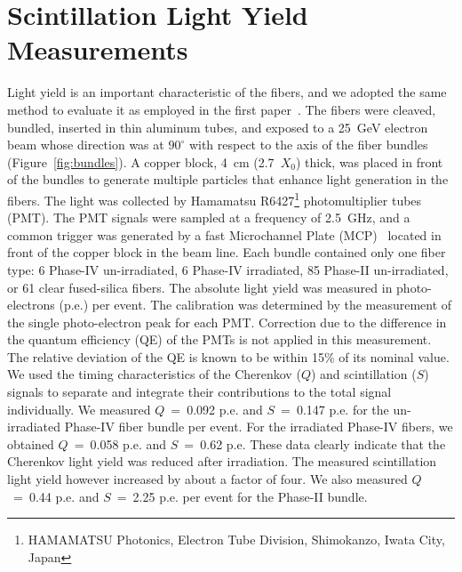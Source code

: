 \documentclass[a4paper,11pt]{article}
\begin{document}
\section{Scintillation Light Yield Measurements}
\label{sec:lightyield}
Light yield is an important characteristic of the fibers, and we adopted the same method to evaluate it as employed in the first paper~\cite{JINSTPaper}.   The fibers were cleaved, bundled, inserted in thin aluminum tubes, and exposed to a 25~GeV electron beam whose direction was at $90^{\circ}$ with respect to the axis of the fiber bundles (Figure~\ref{fig:bundles}). A copper block, 4~cm (2.7~$X_0$) thick, was placed in front of the bundles to generate multiple particles that enhance light generation in the fibers. The light was collected by Hamamatsu R6427\footnote{HAMAMATSU Photonics, Electron Tube Division, Shimokanzo, Iwata City, Japan} photomultiplier tubes (PMT). The PMT signals were sampled at a frequency of 2.5~GHz, and a common trigger was generated by a fast Microchannel Plate (MCP)~\cite{r-MCP} located in front of the copper block in the beam line. Each bundle contained only one fiber type: 6 Phase-IV un-irradiated, 6 Phase-IV irradiated, 85 Phase-II un-irradiated, or 61 clear fused-silica fibers. The absolute light yield was measured in photo-electrons (p.e.) per event. The calibration was determined by the measurement of the single photo-electron peak for each PMT. Correction due to the difference in the quantum efficiency (QE) of the PMTs is not applied in this measurement. The relative deviation of the QE is known to be within 15\% of its nominal value. We used the timing characteristics of the Cherenkov ($Q$) and scintillation ($S$) signals to separate and integrate their contributions to the total signal individually. We measured $Q$~=~0.092 p.e. and $S$~=~0.147 p.e. for the un-irradiated Phase-IV fiber bundle per event. For the irradiated Phase-IV fibers, we obtained $Q$~=~0.058 p.e. and $S$~=~0.62 p.e.  These data clearly indicate that the Cherenkov light yield was reduced after irradiation. The measured scintillation light yield however increased by about a factor of four. We also measured $Q$~=~0.44 p.e. and $S$~=~2.25 p.e. per event for the Phase-II bundle.
\end{document}
